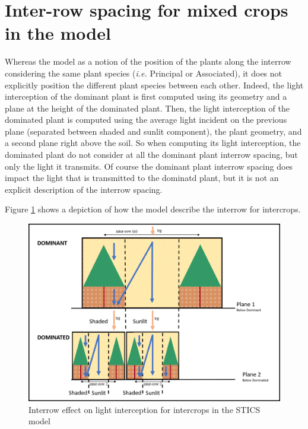 \documentclass[]{book}
\begin{document}
\hypertarget{inter-row-spacing-for-mixed-crops-in-the-model}{%
\section{Inter-row spacing for mixed crops in the model}\label{inter-row-spacing-for-mixed-crops-in-the-model}}

Whereas the model as a notion of the position of the plants along the interrow considering the same plant species (\emph{i.e.} Principal or Associated), it does not explicitly position the different plant species between each other. Indeed, the light interception of the dominant plant is first computed using its geometry and a plane at the height of the dominated plant. Then, the light interception of the dominated plant is computed using the average light incident on the previous plane (separated between shaded and sunlit component), the plant geometry, and a second plane right above the soil. So when computing its light interception, the dominated plant do not consider at all the dominant plant interrow spacing, but only the light it transmits. Of course the dominant plant interrow spacing does impact the light that is transmitted to the dominatd plant, but it is not an explicit description of the interrow spacing.

Figure \ref{fig:interrow} shows a depiction of how the model describe the interrow for intercrops.

\begin{figure}
\centering
\includegraphics{img/Interrow.png}
\caption{\label{fig:interrow}Interrow effect on light interception for intercrops in the STICS model}
\end{figure}
\end{document}
